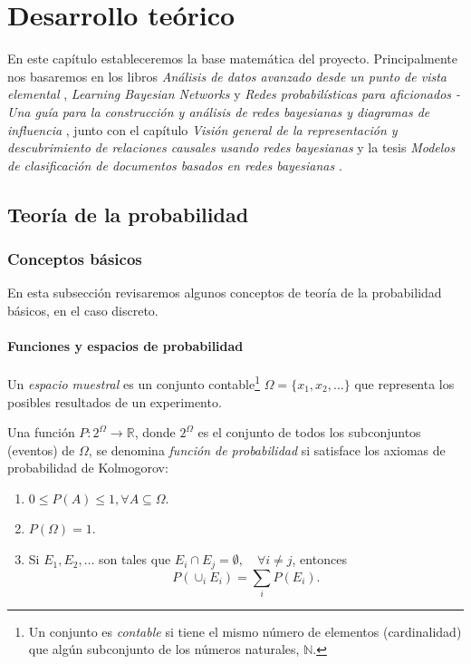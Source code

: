 \chapter{Desarrollo teórico} \label{ch5}
En este capítulo estableceremos la base matemática del proyecto. Principalmente nos basaremos en 
los libros \textit{Análisis de datos avanzado desde un punto de vista elemental} \cite{ada}, 
\textit{Learning Bayesian Networks} \cite{neapolitan} 
y \textit{Redes probabilísticas para aficionados - Una guía para la construcción y análisis de redes 
bayesianas y diagramas de influencia} \cite{pgm}, junto con el capítulo 
\textit{Visión general de la representación y descubrimiento de relaciones causales usando redes 
bayesianas} \cite{Cooper} y la tesis \textit{Modelos de clasificación de documentos basados en redes 
bayesianas} \cite{tesis-alfonso}.

\section{Teoría de la probabilidad}

\subsection{Conceptos básicos}
En esta subsección revisaremos algunos conceptos de teoría de la probabilidad básicos, en el 
caso discreto. 

\subsubsection{Funciones y espacios de probabilidad}
Un {\em espacio muestral} es un conjunto contable\footnote{Un conjunto es {\em contable} si tiene el mismo número de 
elementos (cardinalidad) que algún subconjunto de los números naturales, $\mathbb{N}$.} $\Omega = \{x_1, x_2, 
\dots \}$ que representa los posibles resultados de un experimento.

Una función $P : 2^\Omega \longrightarrow \mathbb{R}$, donde $2^\Omega$ es el conjunto de todos los 
subconjuntos (eventos) de $\Omega$, se denomina {\em función de probabilidad} si satisface los axiomas de 
probabilidad de Kolmogorov:

\begin{enumerate}
    \item $0 \leq P(A) \leq 1, \forall A  \subseteq \Omega$.
    \item $P(\Omega) = 1$.
    \item Si $E_1, E_2, \dots$ son tales que $E_i \cap E_j = \emptyset, \quad \forall i\neq j$, entonces
    $$P\left(\cup_i E_i\right) = \sum_i P(E_i).$$
\end{enumerate}

